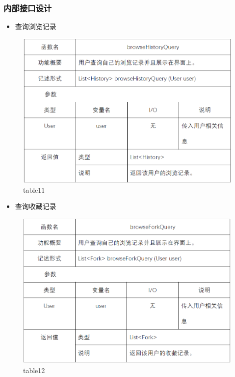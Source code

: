 \subsubsection{内部接口设计}
\begin{itemize}
	\item 查询浏览记录
\end{itemize}
\begin{figure}[!htbp]
	\centering
	\includegraphics[scale=0.7]{image/b11.png} %
	\caption{table11} %
\end{figure}
\begin{itemize}
	\item 查询收藏记录
\end{itemize}
\begin{figure}[!htbp]
	\centering
	\includegraphics[scale=0.7]{image/b12.png} %
	\caption{table12} %
\end{figure}
